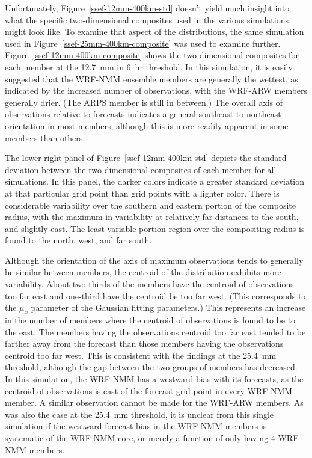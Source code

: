 Unfortunately, \mbox{Figure \ref{ssef-12mm-400km-std}} doesn't yield much insight into what the specific two-dimensional composites used in the various simulations might look like.
To examine that aspect of the distributions, the same simulation used in \mbox{Figure \ref{ssef-25mm-400km-composite}} was used to examine further.
\mbox{Figure \ref{ssef-12mm-400km-composite}} shows the two-dimensional composites for each member at the \mbox{12.7 mm} in \mbox{6 hr} threshold.
In this simulation, it is easily suggested that the WRF-NMM ensemble members are generally the wettest, as indicated by the increased number of observations, with the WRF-ARW members generally drier.
(The ARPS member is still in between.)
The overall axis of observations relative to forecasts indicates a general southeast-to-northeast orientation in most members, although this is more readily apparent in some members than others.


The lower right panel of \mbox{Figure \ref{ssef-12mm-400km-std}} depicts the standard deviation between the two-dimensional composites of each member for all simulations.
In this panel, the darker colors indicate a greater standard deviation at that particular grid point than grid points with a lighter color.
There is considerable variability over the southern and eastern portion of the composite radius, with the maximum in variability at relatively far distances to the south, and slightly east.
The least variable portion region over the compositing radius is found to the north, west, and far south.


Although the orientation of the axis of maximum observations tends to generally be similar between members, the centroid of the distribution exhibits more variability.
About two-thirds of the members have the centroid of observations too far east and one-third have the centroid be too far west.
(This corresponds to the $\mu_x$ parameter of the Gaussian fitting parameters.)
This represents an increase in the number of members where the centroid of observations is found to be to the east.
The members having the observations centroid too far east tended to be farther away from the forecast than those members having the observations centroid too far west.
This is consistent with the findings at the \mbox{25.4 mm} threshold, although the gap between the two groups of members has decreased.
In this simulation, the WRF-NMM has a westward bias with its forecasts, as the centroid of observations is east of the forecast grid point in every WRF-NMM member.
A similar observation cannot be made for the WRF-ARW members.
As was also the case at the \mbox{25.4 mm} threshold, it is unclear from this single simulation if the westward forecast bias in the WRF-NMM members is systematic of the WRF-NMM core, or merely a function of only having 4 WRF-NMM members.


